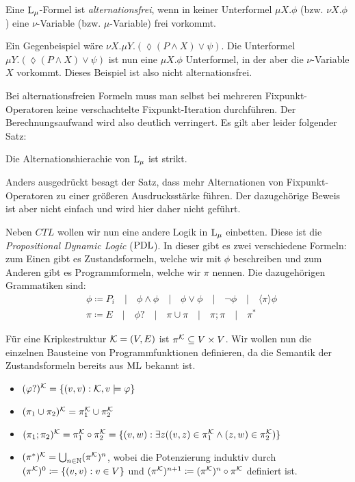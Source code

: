 \begin{definition}
	Eine $\operatorname{L}_\mu$-Formel ist \textit{alternationsfrei}, wenn in keiner Unterformel $\mu X.\phi$ (bzw. $\nu X .\phi$) eine $\nu$-Variable (bzw. $\mu$-Variable) frei vorkommt.
\end{definition}

Ein Gegenbeispiel wäre $\nu X.\mu Y.(\lozenge(P\land X) \lor \psi)$. Die Unterformel $\mu Y.(\lozenge(P\land X) \lor \psi)$ ist nun eine $\mu X.\phi$ Unterformel, in der aber die $\nu$-Variable $X$ vorkommt. Dieses Beispiel ist also nicht alternationsfrei.

Bei alternationsfreien Formeln muss man selbst bei mehreren Fixpunkt-Operatoren keine verschachtelte Fixpunkt-Iteration durchführen. Der Berechnungsaufwand wird also deutlich verringert. Es gilt aber leider folgender Satz:

\begin{satz}
	Die Alternationshierachie von $\operatorname{L}_\mu$ ist strikt.
\end{satz}

Anders ausgedrückt besagt der Satz, dass mehr Alternationen von Fixpunkt-Operatoren zu einer größeren Ausdrucksstärke führen. Der dazugehörige Beweis ist aber nicht einfach und wird hier daher nicht geführt.

Neben $CTL$ wollen wir nun eine andere Logik in $\operatorname{L}_\mu$ einbetten. Diese ist die \textit{Propositional Dynamic Logic} ($\operatorname{PDL}$). In dieser gibt es zwei verschiedene Formeln: zum Einen gibt es Zustandsformeln, welche wir mit $\phi$ beschreiben und zum Anderen gibt es Programmformeln, welche wir $\pi$ nennen. Die dazugehörigen Grammatiken sind:
\begin{align*}
	&\phi \coloneqq P_i \quad\vert\quad \phi\land\phi \quad\vert\quad \phi\lor\phi \quad\vert\quad \neg\phi \quad\vert\quad \langle\pi\rangle\phi \\
	&\pi \coloneqq E \quad\vert\quad \phi? \quad\vert\quad \pi\cup\pi \quad\vert\quad \pi;\pi \quad\vert\quad \pi^\ast
\end{align*}

Für eine Kripkestruktur $\mathcal{K}=(V,E)$ ist $\pi^{\mathcal{K}}\subseteq V\times V$. Wir wollen nun die einzelnen Bausteine von Programmfunktionen definieren, da die Semantik der Zustandsformeln bereits aus $\operatorname{ML}$ bekannt ist.
\begin{itemize}
	\item $(\varphi?)^{\mathcal{K}}=\{(v,v):\mathcal{K},v\models \varphi\}$
	\item $(\pi_1 \cup \pi_2)^{\mathcal{K}} = \pi_1^{\mathcal{K}} \cup \pi_2^{\mathcal{K}}$
	\item $(\pi_1;\pi_2)^{\mathcal{K}} = \pi_1^{\mathcal{K}} \circ \pi_2^{\mathcal{K}} = \{(v,w) : \exists z ((v,z)\in \pi_1^{\mathcal{K}} \land (z,w)\in \pi_2^{\mathcal{K}})\}$
	\item $(\pi^\ast)^{\mathcal{K}}=\bigcup_{n\in\mathbb{N}} (\pi^{\mathcal{K}})^n$, wobei die Potenzierung induktiv durch $(\pi^{\mathcal{K}})^0\coloneqq\{(v,v):v\in V\}$ und $(\pi^{\mathcal{K}})^{n+1}\coloneqq(\pi^{\mathcal{K}})^n \circ \pi^{\mathcal{K}}$ definiert ist.
\end{itemize}

